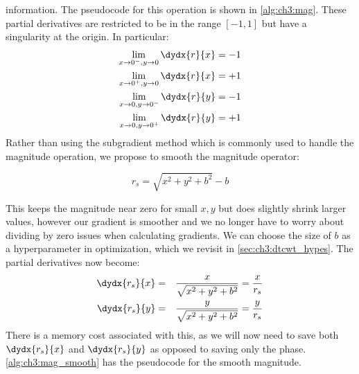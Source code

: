 information. The pseudocode for this operation is shown in
\autoref{alg:ch3:mag}.
%
These partial derivatives are restricted to be in the range $[-1, 1]$ but have a singularity at the origin.
In particular:
\begin{align}
  \lim_{x\rightarrow 0^{-},y\rightarrow 0}  \dydx{r}{x} &= -1 \\
  \lim_{x\rightarrow 0^{+},y\rightarrow 0}  \dydx{r}{x} &= +1 \\
  \lim_{x\rightarrow 0,y\rightarrow 0^{-}}  \dydx{r}{y} &= -1 \\
  \lim_{x\rightarrow 0,y\rightarrow 0^{+}}  \dydx{r}{y} &= +1
\end{align}
Rather than using the subgradient method \cite{boyd_subgradient_2003} which is
commonly used to handle the magnitude operation, we propose to smooth the
magnitude operator:

\begin{equation}\label{eq:ch3:magbias}
 r_s = \sqrt{x^2 + y^2 + b^2} - b
\end{equation}

This keeps the magnitude near zero for small $x,y$ but does slightly shrink larger
values, however our gradient is smoother and we no
longer have to worry about dividing by zero issues when calculating gradients.
We can choose the size of $b$ as a hyperparameter in optimization, which we
revisit in \autoref{sec:ch3:dtcwt_hypes}. The partial derivatives now become:
\begin{eqnarray}
  \dydx{r_s}{x} & = & \frac{x}{\sqrt{x^2 + y^2+b^2}} = \frac{x}{r_s}\\
  \dydx{r_s}{y} & = & \frac{y}{\sqrt{x^2 + y^2+b^2}} = \frac{y}{r_s}
\end{eqnarray}
There is a memory cost associated with this, as we will now need to save both
$\dydx{r_s}{x}$ and $\dydx{r_s}{y}$ as opposed to saving only the phase.
\autoref{alg:ch3:mag_smooth} has the pseudocode for the smooth magnitude.

